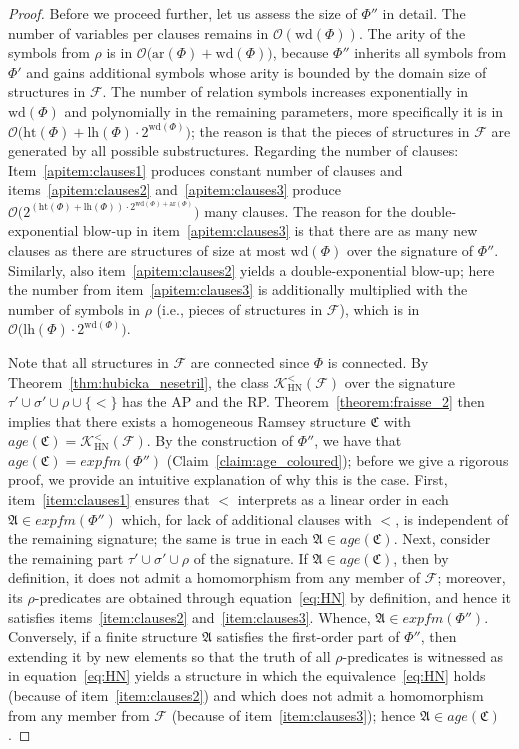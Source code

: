 \documentclass[oneside,reqno,12pt]{amsart}
\theoremstyle{plain}
\theoremstyle{remark}
\newcommand{\struct}[1]{\mathfrak{#1}}
\newcommand{\age}{\ensuremath{\mathit{age}}\xspace}
\newcommand{\efm}{\ensuremath{\mathit{expfm}}\xspace}
\newcommand{\hh}{\ensuremath{\mathrm{ht}}\xspace}
\newcommand{\lh}{\ensuremath{\mathrm{lh}}\xspace}
\newcommand{\wh}{\ensuremath{\mathrm{wd}}\xspace}
\newcommand{\ar}{\ensuremath{\mathrm{ar}}\xspace}
\begin{document}
{\begin{proof}
Before we proceed further, let us assess the size of $\Phi''$ in detail.
The number of variables per clauses remains in $\mathcal{O}(\wh(\Phi))$.
The arity of the symbols from $\rho$ is in $\mathcal{O}\bigl(\ar(\Phi)+\wh(\Phi)\bigr)$, because $\Phi''$ inherits all symbols from $\Phi'$ and gains additional symbols whose arity is bounded by the domain size of structures in $\mathcal{F}$.
The number of relation symbols increases exponentially in $\wh(\Phi)$ and polynomially in the remaining parameters, more specifically it is in $\mathcal{O}\bigl(\hh(\Phi)+\lh(\Phi)\cdot 2^{\wh(\Phi)}\bigr)$; the reason is that the pieces of structures in $\mathcal{F}$ are generated by all possible substructures.
Regarding the number of clauses: Item~\eqref{apitem:clauses1} produces constant number of clauses and items~\eqref{apitem:clauses2} and~\eqref{apitem:clauses3} produce $\mathcal{O}\bigl(2^{(\hh(\Phi)+\lh(\Phi))\cdot 2^{\wh(\Phi)+\ar(\Phi)}} \bigr)$ many clauses.
The reason for the double-exponential blow-up in item~\eqref{apitem:clauses3} is that there are as many new clauses as there are structures of size at most $\wh(\Phi)$ over the signature of $\Phi''$.
Similarly, also item~\eqref{apitem:clauses2} yields a double-exponential blow-up; here the number from item~\eqref{apitem:clauses3} is additionally multiplied with the number of symbols in $\rho$ (i.e., pieces of structures in $\mathcal{F}$), which is in $\mathcal{O}\bigl(\lh(\Phi)\cdot 2^{\wh(\Phi)}\bigr)$.

Note that all structures in $\mathcal{F}$ are connected since $\Phi$ is connected.
By Theorem~\ref{thm:hubicka_nesetril}, the class $\mathcal{K}^{<}_{\mathrm{HN}}(\mathcal{F})$ over the signature $\tau'\cup\sigma'\cup \rho \cup \{<\}$ has the AP and the RP.
Theorem~\ref{theorem:fraisse_2} then implies that there exists a homogeneous Ramsey structure $\struct{C}$ with $\age(\struct{C})=\mathcal{K}^{<}_{\mathrm{HN}}(\mathcal{F})$.
By the construction of $\Phi''$, we have that $\age(\struct{C})=\efm(\Phi'')$ (Claim~\ref{claim:age_coloured}); before we give a rigorous proof, we provide an intuitive explanation of why this is the case.
First, item~\eqref{item:clauses1} ensures that $<$ interprets as a linear order in each $\struct{A}\in \efm(\Phi'')$ which, for lack of additional clauses with $<$, is independent of the remaining signature; the same is true in each $\struct{A}\in \age(\struct{C})$.
Next, consider the remaining part $\tau'\cup \sigma'\cup\rho$ of the signature. If $\struct A\in\age(\struct C)$, then by definition, it does not admit a homomorphism from any member of $\mathcal F$; moreover,  its $\rho$-predicates are obtained through equation~\eqref{eq:HN} by definition, and hence it satisfies items~\eqref{item:clauses2} and~\eqref{item:clauses3}. Whence, $\struct A\in\efm{(\Phi'')}$. Conversely, if a finite structure  $\struct A$ satisfies the first-order part of $\Phi''$, then extending it by new elements so that the truth of all $\rho$-predicates is witnessed as in equation~\eqref{eq:HN} yields a structure in which the equivalence~\eqref{eq:HN} holds (because of item~\eqref{item:clauses2}) and which does not admit a homomorphism from any member from $\mathcal F$ (because of item~\eqref{item:clauses3}); hence $\struct A\in\age(\struct C)$.
 

\end{proof}}
\end{document}
